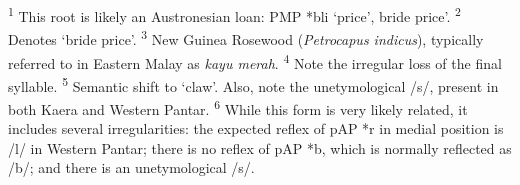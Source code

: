 \raggedright
\textsuperscript{1} This root is likely an Austronesian loan: PMP *b{\textschwa}li `price', bride price'.  
\textsuperscript{2} Denotes `bride price'.  
\textsuperscript{3} New Guinea Rosewood (\textit{Petrocapus indicus}), typically referred to in Eastern Malay as \textit{kayu merah}.  
\textsuperscript{4} Note the irregular loss of the final syllable.  
\textsuperscript{5} Semantic shift to `claw'. Also, note the unetymological /s/, present in both Kaera and Western Pantar.  
\textsuperscript{6} While this form is very likely related, it includes several irregularities: the expected reflex of pAP *r in medial position is /l/ in Western Pantar; there is no reflex of pAP *b, which is normally reflected as /b/; and there is an unetymological /s/.  





